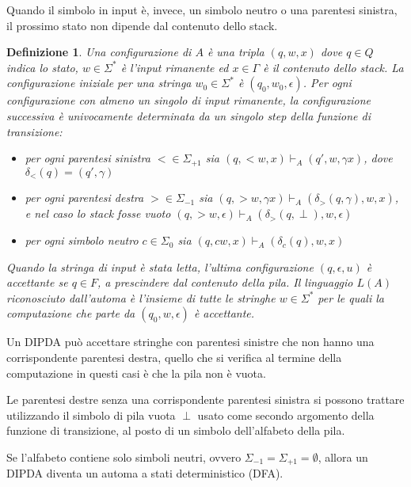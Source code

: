 \documentclass[a4paper,12pt]{report}
\newtheorem{definition}{Definizione}[chapter]
\theoremstyle{propositionstyle}
\begin{document}
    Quando il simbolo in input è, invece, un simbolo neutro o una parentesi sinistra, il prossimo stato non dipende dal contenuto dello stack.

    \begin{definition}\label{def:configuration}
    Una configurazione di $A$ è una tripla $\left(q, w, x\right)$ dove $q \in Q$ indica lo stato, $w \in \Sigma^*$ è l'input rimanente ed  $x \in \Gamma$ è il contenuto dello stack.
    La configurazione iniziale per una stringa $w_0 \in \Sigma^*$ è $\left(q_0, w_0, \epsilon\right)$.
    Per ogni configurazione con almeno un singolo di input rimanente, la configurazione successiva è univocamente determinata da un singolo step della funzione di transizione:
    \begin{itemize}
        \item per ogni parentesi sinistra $< \in \Sigma_{+1}$ sia $(q, <w, x) \vdash_{A} (q', w, \gamma x)$, dove $\delta_{<}(q) = (q', \gamma)$
        \item per ogni parentesi destra $> \in \Sigma_{-1}$ sia $(q, >w, \gamma x) \vdash_{A} (\delta_{>}(q, \gamma), w, x)$, e nel caso lo stack fosse vuoto $(q, >w, \epsilon) \vdash_{A} (\delta_{>}(q, \perp), w, \epsilon)$
        \item per ogni simbolo neutro $c \in \Sigma_{0}$ sia $(q, cw, x) \vdash_{A} (\delta_{c}(q), w, x)$
    \end{itemize}

    Quando la stringa di input è stata letta, l'ultima configurazione $\left(q, \epsilon, u\right)$ è accettante se $q \in F$, a prescindere dal contenuto della pila.
    Il linguaggio $L\left(A\right)$ riconosciuto dall'automa è l'insieme di tutte le stringhe $w \in \Sigma^*$ per le quali la computazione che parte da $\left(q_0, w, \epsilon\right)$ è accettante.
    \end{definition}

    Un DIPDA può accettare stringhe con parentesi sinistre che non hanno una corrispondente parentesi destra, quello che si verifica al termine della computazione in questi casi è che la pila non è vuota.

    Le parentesi destre senza una corrispondente parentesi sinistra si possono trattare utilizzando il simbolo di pila vuota $\perp$ usato come secondo argomento della funzione di transizione, al posto di un simbolo dell'alfabeto della pila.

    Se l'alfabeto contiene solo simboli neutri, ovvero $\Sigma_{-1} = \Sigma_{+1} = \emptyset$, allora un DIPDA diventa un automa a stati deterministico (DFA).
\end{document}
